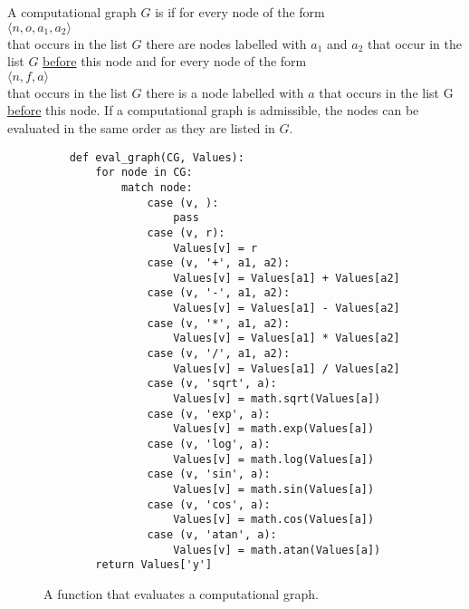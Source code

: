 \begin{Definition}[admissible]
A computational graph $G$ is   if for every node of the form
\\[0.2cm]
\hspace*{1.3cm}
$\langle n, o, a_1, a_2\rangle$
\\[0.2cm]
that occurs in the list $G$ there are nodes labelled with $a_1$ and $a_2$ that occur in the list $G$ \underline{before} this node and for
every  node of the form
\\[0.2cm]
\hspace*{1.3cm}
$\langle n, f, a\rangle$
\\[0.2cm]
that occurs in the list $G$ there is a node labelled with $a$ that occurs in the list G \underline{before} this node.
If a computational graph is admissible, the nodes can be evaluated in the same order as they are listed in $G$.
\eoxs
\end{Definition}
\begin{figure}[!ht]
\centering
\begin{verbatim}
    def eval_graph(CG, Values):
        for node in CG:
            match node:
                case (v, ):
                    pass
                case (v, r):
                    Values[v] = r
                case (v, '+', a1, a2):
                    Values[v] = Values[a1] + Values[a2]
                case (v, '-', a1, a2):
                    Values[v] = Values[a1] - Values[a2]
                case (v, '*', a1, a2):
                    Values[v] = Values[a1] * Values[a2]
                case (v, '/', a1, a2):
                    Values[v] = Values[a1] / Values[a2]
                case (v, 'sqrt', a):
                    Values[v] = math.sqrt(Values[a])            
                case (v, 'exp', a):
                    Values[v] = math.exp(Values[a])
                case (v, 'log', a):
                    Values[v] = math.log(Values[a])
                case (v, 'sin', a):
                    Values[v] = math.sin(Values[a])
                case (v, 'cos', a):
                    Values[v] = math.cos(Values[a])
                case (v, 'atan', a):
                    Values[v] = math.atan(Values[a])
        return Values['y']
\end{verbatim}
\vspace*{-0.3cm}
\caption{A function that evaluates a computational graph.}
\label{fig:Reverse-Mode-AD.ipynb:eval_graph}
\end{figure}

